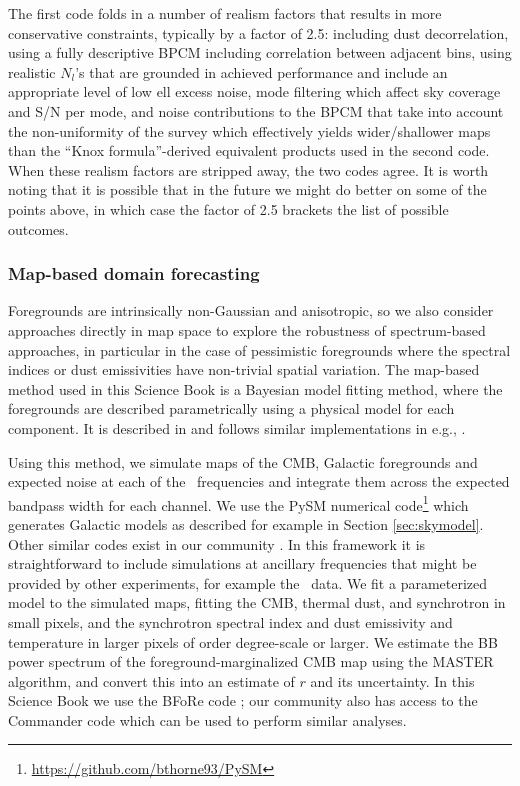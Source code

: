 The first code folds in a number of realism factors that results in more conservative
constraints, typically by a factor of 2.5: including dust decorrelation, using a 
fully descriptive BPCM including correlation between adjacent bins, 
using realistic $N_l$'s that are grounded in achieved performance and include
an appropriate level of low ell excess noise, mode filtering which affect sky coverage
and S/N per mode, and noise contributions to the BPCM that take into account the 
non-uniformity of the survey which effectively yields wider/shallower maps than the 
``Knox formula''-derived \cite{Knox:1995dq} equivalent products used in the second code. When these realism factors
are stripped away, the two codes agree. It is worth noting that it is possible that in the future we might do better on 
some of the points above, in which case the factor of 2.5 brackets the list of 
possible outcomes.  

\subsubsection{Map-based domain forecasting}

Foregrounds are intrinsically non-Gaussian and anisotropic, so we also consider approaches directly in map space to explore the robustness of spectrum-based approaches, in particular in the case of pessimistic foregrounds where the spectral indices or dust emissivities have non-trivial spatial variation. The map-based method used in this Science Book is a Bayesian model fitting method, where the foregrounds are described parametrically using a physical model for each component. It is described in \cite{Alonso:2016xft} and follows similar implementations in e.g., \cite{Eriksen:2005dr}.

Using this method, we simulate maps of the CMB, Galactic foregrounds and expected noise at each of the \cmbexp\ frequencies and integrate them across the expected bandpass width for each channel. We use the PySM numerical code\footnote{\url{https://github.com/bthorne93/PySM}} which generates Galactic models as described for example in Section \ref{sec:skymodel}. Other similar codes exist in our community \cite{Delabrouille:2012ye}. In this framework it is straightforward to include simulations at ancillary frequencies that might be provided by other experiments, for example the \planck\ data. We fit a parameterized model to the simulated maps, fitting the CMB, thermal dust, and synchrotron in small pixels, and the synchrotron spectral index and dust emissivity and temperature in larger pixels of order degree-scale or larger. We estimate the BB power spectrum of the foreground-marginalized CMB map using the MASTER \cite{Hivon:2001jp} algorithm, and convert this into an estimate of $r$ and its uncertainty. In this Science Book we use the BFoRe code \cite{Alonso:2016xft}; our community also has access to the Commander code which can be used to perform similar analyses.

